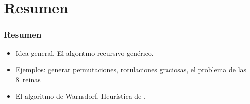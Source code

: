 \documentclass[english, spanish, fleqn,%
hyperref = {colorlinks, urlcolor = blue}%
]{beamer}
\begin{document}
\section{Resumen}

\begin{frame}
  \setcounter{beamerpauses}{2}
  \frametitle{Resumen}

  \begin{itemize}
  \item
    Idea general.
    El algoritmo recursivo genérico.
  \item
    Ejemplos:
    generar permutaciones,
    rotulaciones graciosas,
    el problema de las 8~reinas
  \item
    El algoritmo de Warnsdorf.
    Heurística de .
  \end{itemize}
\end{frame}
\end{document}
